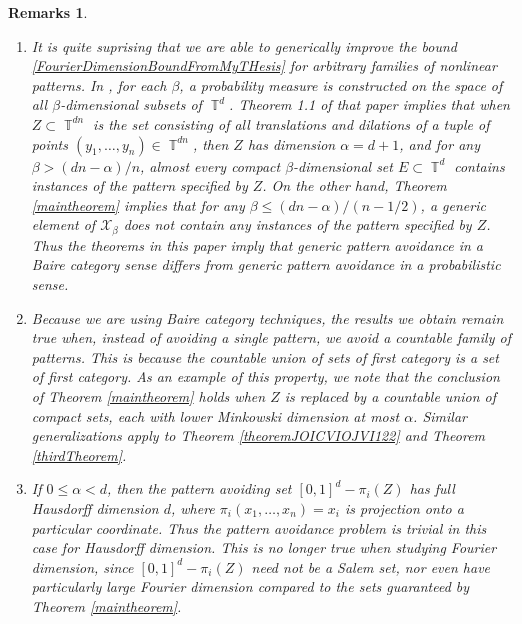 \documentclass[dvipsnames,letterpaper,12pt]{article}
\numberwithin{equation}{section}
\DeclareMathOperator{\TT}{\mathbb{T}}
\newtheorem{remarks}[theorem]{Remarks}
\numberwithin{theorem}{section}
\begin{document}
\begin{remarks}
    \ 
    \begin{enumerate}
        \item It is quite suprising that we are able to generically improve the bound \eqref{FourierDimensionBoundFromMyTHesis} for arbitrary families of nonlinear patterns. In \cite{Schmerkin2}, for each $\beta$, a probability measure is constructed on the space of all $\beta$-dimensional subsets of $\TT^d$. Theorem 1.1 of that paper implies that when $Z \subset \TT^{dn}$ is the set consisting of all translations and dilations of a tuple of points $(y_1,\dots,y_n) \in \TT^{dn}$, then $Z$ has dimension $\alpha = d+1$, and for any $\beta > (dn - \alpha)/n$, \emph{almost every} compact $\beta$-dimensional set $E \subset \TT^d$ \emph{contains} instances of the pattern specified by $Z$. On the other hand, Theorem \ref{maintheorem} implies that for any $\beta \leq (dn - \alpha)/(n-1/2)$, a generic element of $\mathcal{X}_\beta$ does not contain any instances of the pattern specified by $Z$. Thus the theorems in this paper imply that generic pattern avoidance in a Baire category sense differs from generic pattern avoidance in a probabilistic sense.

        \item Because we are using Baire category techniques, the results we obtain remain true when, instead of avoiding a single pattern, we avoid a countable family of patterns. This is because the countable union of sets of first category is a set of first category. As an example of this property, we note that the conclusion of Theorem \ref{maintheorem} holds when $Z$ is replaced by a \emph{countable union} of compact sets, each with lower Minkowski dimension at most $\alpha$. Similar generalizations apply to Theorem \ref{theoremJOICVIOJVI122} and Theorem \ref{thirdTheorem}.

        \item If $0 \leq \alpha < d$, then the pattern avoiding set $[0,1]^d - \pi_i(Z)$ has full Hausdorff dimension $d$, where $\pi_i(x_1,\dots,x_n) = x_i$ is projection onto a particular coordinate. Thus the pattern avoidance problem is trivial in this case for Hausdorff dimension. This is no longer true when studying Fourier dimension, since $[0,1]^d - \pi_i(Z)$ need not be a Salem set, nor even have particularly large Fourier dimension compared to the sets guaranteed by Theorem \ref{maintheorem}.


\end{enumerate}
\end{remarks}
\end{document}
